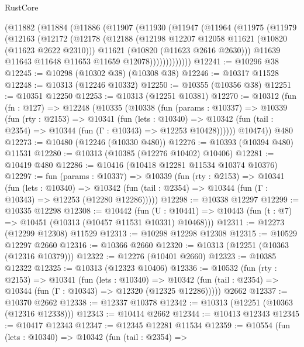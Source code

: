 \begin{lexlean}{RustCore}
\begin{coremodule}
      (@11882
        (@11884
          (@11886
            (@11907
              (@11930
                (@11947
                  (@11964
                    (@11975
                      (@11979
                        (@12163
                          (@12172
                            (@12178
                              (@12188
                                (@12198 @12207 @12058 @11621 (@10820 (@11623 @2622 @2310)))
                                @11621
                                (@10820 (@11623 @2616 @2630)))
                              @11639
                              @11643
                              @11648
                              @11653
                              @11659
                              @12078)))))))))))))
@12241 := @10296 @38
@12245 := @10298 (@10302 @38) (@10308 @38)
@12246 := @10317 @11528
@12248 := @10313 (@12246 @10332)
@12250 := @10355 (@10356 @38)
@12251 := @10351 @12250
@12253 := @10313 (@12251 @10381)
@12270 := @10312
    (fun (fn : @127) =>
    @12248
      (@10335
        (@10338
          (fun (params : @10337) =>
          @10339
            (fun (rty : @2153) =>
            @10341
              (fun (lets : @10340) =>
              @10342 (fun (tail : @2354) => @10344 (fun (Γ : @10343) => @12253 @10428))))))
        @10474))
    @480
@12273 := @10480 (@12246 (@10330 @480))
@12276 := @10393 (@10394 @480) @11531
@12280 := @10313 (@10385 (@12276 @10402) @10406)
@12281 := @10419 @480
@12286 := @10416 (@10418 @12281 @11534 @10374 @10376)
@12297 := fun (params : @10337) =>
  @10339
    (fun (rty : @2153) =>
    @10341
      (fun (lets : @10340) =>
      @10342 (fun (tail : @2354) => @10344 (fun (Γ : @10343) => @12253 (@12280 @12286)))))
@12298 := @10338 @12297
@12299 := @10335 @12298
@12308 := @10442
    (fun (U : @10441) => @10443 (fun (t : @7) => @10451 (@10313 (@10457 @11531 @10331) @10468)))
@12311 := @12273 (@12299 @12308) @11529
@12313 := @10298 @12298 @12308
@12315 := @10529 @12297 @2660
@12316 := @10366 @2660
@12320 := @10313 (@12251 (@10363 (@12316 @10379)))
@12322 := @12276 (@10401 @2660)
@12323 := @10385 @12322
@12325 := @10313 (@12323 @10406)
@12336 := @10532
    (fun (rty : @2153) =>
    @10341
      (fun (lets : @10340) =>
      @10342 (fun (tail : @2354) => @10344 (fun (Γ : @10343) => @12320 (@12325 @12286)))))
    @2662
@12337 := @10370 @2662
@12338 := @12337 @10378
@12342 := @10313 (@12251 (@10363 (@12316 @12338)))
@12343 := @10414 @2662
@12344 := @10413 @12343
@12345 := @10417 @12343
@12347 := @12345 @12281 @11534
@12359 := @10554
    (fun (lets : @10340) =>
    @10342
      (fun (tail : @2354) =>

\end{coremodule}
\end{lexlean}
